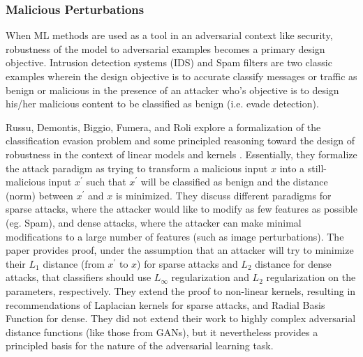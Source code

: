 \documentclass[11pt]{article}
\begin{document}
\subsubsection{Malicious Perturbations}

When ML methods are used as a tool in an adversarial context like security, robustness of the model to adversarial examples becomes a primary design objective.  Intrusion detection systems (IDS) and Spam filters are two classic examples wherein the design objective is to accurate classify messages or traffic as benign or malicious in the presence of an attacker who's objective is to design his/her malicious content to be classified as benign (i.e. evade detection).  %

Russu, Demontis, Biggio, Fumera, and Roli explore a formalization of the classification evasion problem and some principled reasoning toward the design of robustness in the context of linear models and kernels \cite{russu2016secure}.  Essentially, they formalize the attack paradigm as trying to transform a malicious input $x$ into a still-malicious input $x^\prime$ such that $x^\prime$ will be classified as benign and the distance (norm) between $x^\prime$ and $x$ is minimized.  They discuss different paradigms for sparse attacks, where the attacker would like to modify as few features as possible (eg. Spam), and dense attacks, where the attacker can make minimal modifications to a large number of features (such as image perturbations).  The paper provides proof, under the assumption that an attacker will try to minimize their $L_1$ distance (from $x^\prime$ to $x$) for sparse attacks and $L_2$ distance for dense attacks, that classifiers should use $L_{\infty}$ regularization and $L_2$ regularization on the parameters, respectively.  They extend the proof to non-linear kernels, resulting in recommendations of Laplacian kernels for sparse attacks, and Radial Basis Function for dense.  They did not extend their work to highly complex adversarial distance functions (like those from GANs), but it nevertheless provides a principled basis for the nature of the adversarial learning task.
\end{document}
